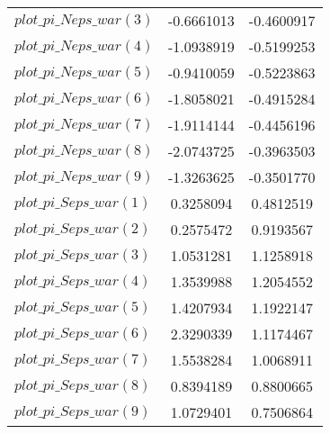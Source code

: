 \begin{center}
\begin{longtable}{lcc}
$plot\_pi\_N eps\_war (3)   $	 & 	     -0.6661013	 & 	     -0.4600917 \\ 
$plot\_pi\_N eps\_war (4)   $	 & 	     -1.0938919	 & 	     -0.5199253 \\ 
$plot\_pi\_N eps\_war (5)   $	 & 	     -0.9410059	 & 	     -0.5223863 \\ 
$plot\_pi\_N eps\_war (6)   $	 & 	     -1.8058021	 & 	     -0.4915284 \\ 
$plot\_pi\_N eps\_war (7)   $	 & 	     -1.9114144	 & 	     -0.4456196 \\ 
$plot\_pi\_N eps\_war (8)   $	 & 	     -2.0743725	 & 	     -0.3963503 \\ 
$plot\_pi\_N eps\_war (9)   $	 & 	     -1.3263625	 & 	     -0.3501770 \\ 
$plot\_pi\_S eps\_war (1)   $	 & 	      0.3258094	 & 	      0.4812519 \\ 
$plot\_pi\_S eps\_war (2)   $	 & 	      0.2575472	 & 	      0.9193567 \\ 
$plot\_pi\_S eps\_war (3)   $	 & 	      1.0531281	 & 	      1.1258918 \\ 
$plot\_pi\_S eps\_war (4)   $	 & 	      1.3539988	 & 	      1.2054552 \\ 
$plot\_pi\_S eps\_war (5)   $	 & 	      1.4207934	 & 	      1.1922147 \\ 
$plot\_pi\_S eps\_war (6)   $	 & 	      2.3290339	 & 	      1.1174467 \\ 
$plot\_pi\_S eps\_war (7)   $	 & 	      1.5538284	 & 	      1.0068911 \\ 
$plot\_pi\_S eps\_war (8)   $	 & 	      0.8394189	 & 	      0.8800665 \\ 
$plot\_pi\_S eps\_war (9)   $	 & 	      1.0729401	 & 	      0.7506864 \\ 
\end{longtable}
 \end{center}
